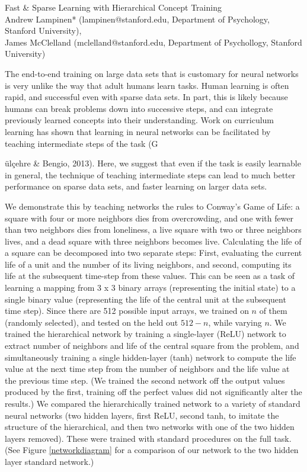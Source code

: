 \documentclass[10pt]{article}
\begin{document}
\begingroup  
  \centering
  \large Fast \& Sparse Learning with Hierarchical Concept Training\\[1em]
  \small{Andrew Lampinen* (lampinen@stanford.edu, Department of Psychology, Stanford University),\\ James McClelland (mclelland@stanford.edu, Department of Psychollogy, Stanford University)}\par
\endgroup
\vspace{10pt}
The end-to-end training on large data sets that is customary for neural networks is very unlike the way that adult humans learn tasks. Human learning is often rapid, and successful even with sparse data sets. In part, this is likely because humans can break problems down into successive steps, and can integrate previously learned concepts into their understanding. Work on curriculum learning has shown that learning in neural networks can be facilitated by teaching intermediate steps of the task (G{\"{u}l\c{c}ehre \& Bengio, 2013). Here, we suggest that even if the task is easily learnable in general, the technique of teaching intermediate steps can lead to much better performance on sparse data sets, and faster learning on larger data sets.\par
We demonstrate this by teaching networks the rules to Conway's Game of Life: a square with four or more neighbors dies from overcrowding, and one with fewer than two neighbors dies from loneliness, a live square with two or three neighbors lives, and a dead square with three neighbors becomes live. Calculating the life of a square can be decomposed into two separate steps: First, evaluating the current life of a unit and the number of its living neighbors, and second, computing its life at the subsequent time-step from these values. This can be seen as a task of learning a mapping from 3 x 3 binary arrays (representing the initial state) to a single binary value (representing the life of the central unit at the subsequent time step). Since there are 512 possible input arrays, we trained on $n$ of them (randomly selected), and tested on the held out $512-n$, while varying $n$. We trained the hierarchical network by training a single-layer (ReLU) network to extract number of neighbors and life of the central square from the problem, and simultaneously training a single hidden-layer (tanh) network to compute the life value at the next time step from the number of neighbors and the life value at the previous time step. (We trained the second network off the output values produced by the first, training off the perfect values did not significantly alter the results.) We compared the hierarchically trained network to a variety of standard neural networks (two hidden layers, first ReLU, second tanh, to imitate the structure of the hierarchical, and then two networks with one of the two hidden layers removed). These were trained with standard procedures on the full task. (See Figure \ref{networkdiagram} for a comparison of our network to the two hidden layer standard network.)\par
}
\end{document}
